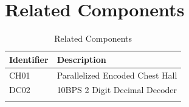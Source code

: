 \documentclass[10pt]{datasheet}
\begin{document}
\section{Related Components}
\begin{table}[H]
    \caption{Related Components}
    \begin{tabularx}{\textwidth}{ l | l }
        \thickhline
        \textbf{Identifier} & \textbf{Description} \\
        \hline
        CH01 & Parallelized Encoded Chest Hall \\
        \hline
        DC02 & 10BPS 2 Digit Decimal Decoder \\
        \thickhline
    \end{tabularx}
\end{table}
\end{document}
